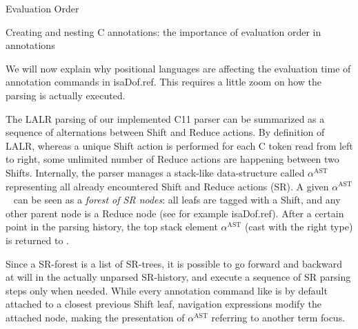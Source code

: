 \begin{isabellebody}
\begin{isamarkuptext}
\end{isamarkuptext}\isamarkuptrue%
%
\begin{isamarkupsubsection*}%
[label = {annot2},type = {scholarly_paper.technical}, args={label = {annot2},type = {scholarly_paper.technical}, Isa_COL.text_element.level = {}, Isa_COL.text_element.referentiable = {False}, Isa_COL.text_element.variants = {{STR ''outline'', STR ''document''}}, scholarly_paper.text_section.main_author = {}, scholarly_paper.text_section.fixme_list = {}, Isa_COL.text_element.level = {}, scholarly_paper.technical.definition_list = {}}]Evaluation Order%
\end{isamarkupsubsection*}\isamarkuptrue%
%
\begin{isamarkupfigure*}%
[label = {C-sample5},type = {Isa_COL.figure}, args={label = {C-sample5},type = {Isa_COL.figure}, Isa_COL.figure.relative_width = {62}, Isa_COL.figure.src = {figures/A-C-Source5}, Isa_COL.figure.spawn_columns = {True}}]Creating and nesting C annotations: the importance of evaluation order in annotations%
\end{isamarkupfigure*}\isamarkuptrue%
%
\begin{isamarkuptext}%
We will now explain why positional languages are affecting the evaluation time of
annotation commands in \csname isaDof.ref. This requires a little zoom on how the
parsing is actually executed.

The LALR parsing of our implemented C11 parser can be summarized as a sequence of alternations
between Shift and Reduce actions. By definition of LALR, whereas a unique Shift action is performed
for each C token read from left to right, some unlimited number of Reduce actions are happening
between two Shifts. Internally, the parser manages a stack-like data-structure called
$\alpha^{\text{AST}}$~ representing all already encountered Shift and
Reduce actions (SR). A given $\alpha^{\text{AST}}$~ can be seen as a
\emph{forest of SR nodes}: all leafs are tagged with a Shift, and any other parent
node is a Reduce node (see for example \csname isaDof.ref). After a
certain point in the parsing history, the top stack element $\alpha^{\text{AST}}$ (cast with the
right type) is returned to .

Since a SR-forest is a list of SR-trees, it is possible to go forward and backward at will in the
actually unparsed SR-history, and execute a sequence of SR parsing steps only when needed. While
every annotation command like  is by default attached to
a closest previous Shift leaf, navigation expressions modify the attached node, making the
presentation of $\alpha^{\text{AST}}$ referring to another term focus.


\end{isamarkuptext}
\end{isabellebody}
